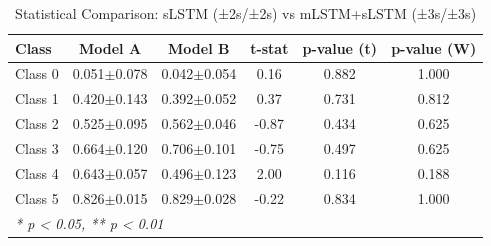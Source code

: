 \begin{table}[htbp]
\centering
\caption{Statistical Comparison: sLSTM (±2s/±2s) vs mLSTM+sLSTM (±3s/±3s)}
\label{tab:comparison_class_slstm_±2s_±2s_vs_mlstmslstm_±3s_±3s}
\begin{tabular}{lccccc}
\toprule
\textbf{Class} & \textbf{Model A} & \textbf{Model B} & \textbf{t-stat} & \textbf{p-value (t)} & \textbf{p-value (W)} \\
\midrule
Class 0 & 0.051$\pm$0.078 & 0.042$\pm$0.054 & 0.16 & 0.882 & 1.000 \\
Class 1 & 0.420$\pm$0.143 & 0.392$\pm$0.052 & 0.37 & 0.731 & 0.812 \\
Class 2 & 0.525$\pm$0.095 & 0.562$\pm$0.046 & -0.87 & 0.434 & 0.625 \\
Class 3 & 0.664$\pm$0.120 & 0.706$\pm$0.101 & -0.75 & 0.497 & 0.625 \\
Class 4 & 0.643$\pm$0.057 & 0.496$\pm$0.123 & 2.00 & 0.116 & 0.188 \\
Class 5 & 0.826$\pm$0.015 & 0.829$\pm$0.028 & -0.22 & 0.834 & 1.000 \\
\bottomrule
\multicolumn{6}{l}{\textit{* p < 0.05, ** p < 0.01}} \\
\end{tabular}
\end{table}
